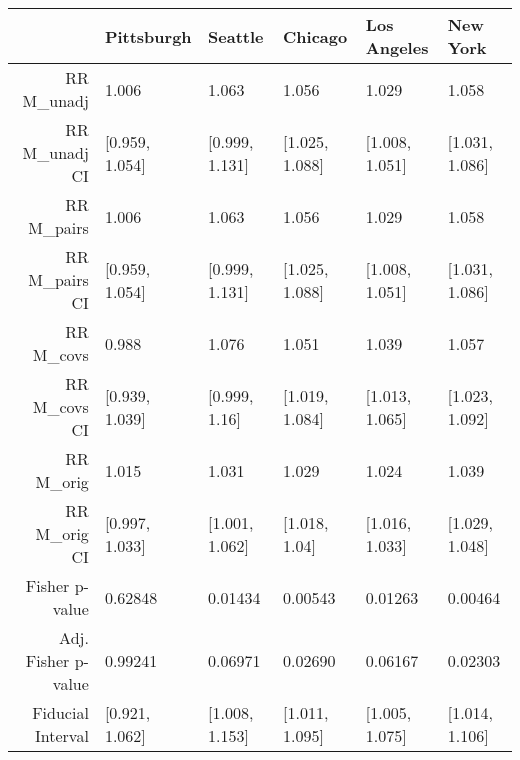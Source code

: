 \begin{table}[ht]
\centering
\begin{tabular}{rlllll}
  \hline
 & Pittsburgh & Seattle & Chicago & Los Angeles & New York \\ 
  \hline
RR M\_unadj & 1.006 & 1.063 & 1.056 & 1.029 & 1.058 \\ 
  RR M\_unadj CI & [0.959, 1.054] & [0.999, 1.131] & [1.025, 1.088] & [1.008, 1.051] & [1.031, 1.086] \\ 
  RR M\_pairs & 1.006 & 1.063 & 1.056 & 1.029 & 1.058 \\ 
  RR M\_pairs CI & [0.959, 1.054] & [0.999, 1.131] & [1.025, 1.088] & [1.008, 1.051] & [1.031, 1.086] \\ 
  RR M\_covs & 0.988 & 1.076 & 1.051 & 1.039 & 1.057 \\ 
  RR M\_covs CI & [0.939, 1.039] & [0.999, 1.16] & [1.019, 1.084] & [1.013, 1.065] & [1.023, 1.092] \\ 
  RR M\_orig & 1.015 & 1.031 & 1.029 & 1.024 & 1.039 \\ 
  RR M\_orig CI & [0.997, 1.033] & [1.001, 1.062] & [1.018, 1.04] & [1.016, 1.033] & [1.029, 1.048] \\ 
  Fisher p-value & 0.62848 & 0.01434 & 0.00543 & 0.01263 & 0.00464 \\ 
  Adj. Fisher p-value & 0.99241 & 0.06971 & 0.02690 & 0.06167 & 0.02303 \\ 
  Fiducial Interval & [0.921, 1.062] & [1.008, 1.153] & [1.011, 1.095] & [1.005, 1.075] & [1.014, 1.106] \\ 
   \hline
\end{tabular}
\end{table}
